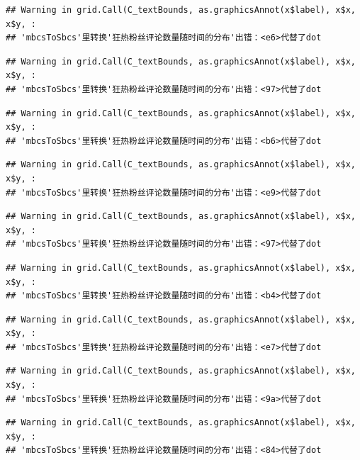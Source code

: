 \documentclass[
]{article}
\begin{document}
\begin{verbatim}
## Warning in grid.Call(C_textBounds, as.graphicsAnnot(x$label), x$x, x$y, :
## 'mbcsToSbcs'里转换'狂热粉丝评论数量随时间的分布'出错：<e6>代替了dot
\end{verbatim}

\begin{verbatim}
## Warning in grid.Call(C_textBounds, as.graphicsAnnot(x$label), x$x, x$y, :
## 'mbcsToSbcs'里转换'狂热粉丝评论数量随时间的分布'出错：<97>代替了dot
\end{verbatim}

\begin{verbatim}
## Warning in grid.Call(C_textBounds, as.graphicsAnnot(x$label), x$x, x$y, :
## 'mbcsToSbcs'里转换'狂热粉丝评论数量随时间的分布'出错：<b6>代替了dot
\end{verbatim}

\begin{verbatim}
## Warning in grid.Call(C_textBounds, as.graphicsAnnot(x$label), x$x, x$y, :
## 'mbcsToSbcs'里转换'狂热粉丝评论数量随时间的分布'出错：<e9>代替了dot
\end{verbatim}

\begin{verbatim}
## Warning in grid.Call(C_textBounds, as.graphicsAnnot(x$label), x$x, x$y, :
## 'mbcsToSbcs'里转换'狂热粉丝评论数量随时间的分布'出错：<97>代替了dot
\end{verbatim}

\begin{verbatim}
## Warning in grid.Call(C_textBounds, as.graphicsAnnot(x$label), x$x, x$y, :
## 'mbcsToSbcs'里转换'狂热粉丝评论数量随时间的分布'出错：<b4>代替了dot
\end{verbatim}

\begin{verbatim}
## Warning in grid.Call(C_textBounds, as.graphicsAnnot(x$label), x$x, x$y, :
## 'mbcsToSbcs'里转换'狂热粉丝评论数量随时间的分布'出错：<e7>代替了dot
\end{verbatim}

\begin{verbatim}
## Warning in grid.Call(C_textBounds, as.graphicsAnnot(x$label), x$x, x$y, :
## 'mbcsToSbcs'里转换'狂热粉丝评论数量随时间的分布'出错：<9a>代替了dot
\end{verbatim}

\begin{verbatim}
## Warning in grid.Call(C_textBounds, as.graphicsAnnot(x$label), x$x, x$y, :
## 'mbcsToSbcs'里转换'狂热粉丝评论数量随时间的分布'出错：<84>代替了dot
\end{verbatim}
\end{document}
